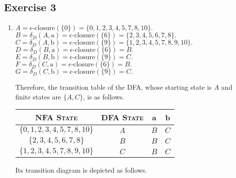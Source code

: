 \documentclass{CompilerAssignment}
\newcommand{\eclose}{\epsilon\text{-closure}}
\newcommand{\dtran}{\delta_D}
\begin{document}
\subsection{Exercise 3}

\begin{enumerate}
    \item
    $A = \eclose(\{0\})=\{0, 1, 2, 3, 4, 5, 7, 8, 10\}.$\\
    $B = \dtran(A, \text{a}) = \eclose(\{6\}) = \{2, 3, 4, 5, 6, 7, 8\}.$\\
    $C = \dtran(A, \text{b}) = \eclose(\{9\}) = \{1, 2, 3, 4, 5, 7, 8, 9, 10\}.$\\
    $D = \dtran(B, \text{a}) = \eclose(\{6\}) = B.$\\
    $E = \dtran(B, \text{b}) = \eclose(\{9\}) = C.$\\
    $F = \dtran(C, \text{a}) = \eclose(\{6\}) = B.$\\
    $G = \dtran(C, \text{b}) = \eclose(\{9\}) = C.$

    Therefore, the transition table of the DFA, whose starting state is $A$ and finite states are $\{A, C\}$, is as follows.

    \begin{center}
        \begin{tabular}{cccc}
            \toprule
            \textsc{NFA State} & \textsc{DFA State} & a & b\\
            \midrule
            \(\{0, 1, 2, 3, 4, 5, 7, 8, 10\}\) & $A$ & $B$ & $C$\\
            \(\{2, 3, 4, 5, 6, 7, 8\}\) & $B$ & $B$ & $C$\\
            \(\{1, 2, 3, 4, 5, 7, 8, 9, 10\}\) & $C$ & $B$ & $C$\\
            \bottomrule
        \end{tabular}
    \end{center}

    Its transition diagram is depicted as follows.

    \begin{center}
    \end{center}


\end{enumerate}
\end{document}
